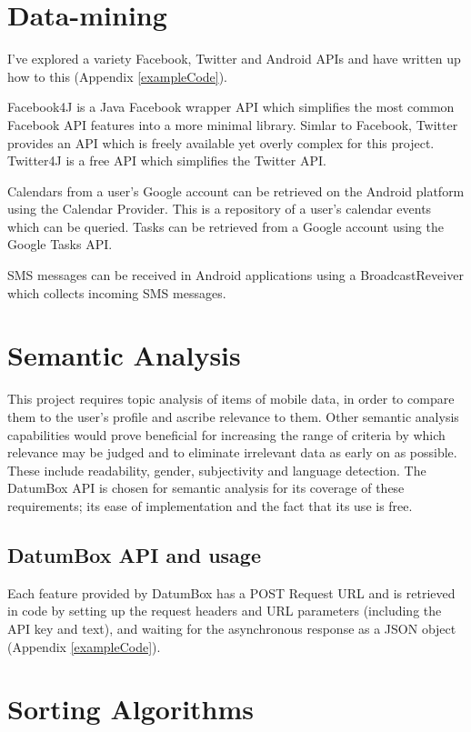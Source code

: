 \section{Data-mining}

I've explored a variety Facebook, Twitter and Android APIs and have written up how to this  (Appendix \ref{exampleCode}).

Facebook4J is a Java Facebook wrapper API which simplifies the most common Facebook API features into a more minimal library. Simlar to Facebook, Twitter provides an API which is freely available yet overly complex for this project. Twitter4J is a free API which simplifies the Twitter API.

Calendars from a user's Google account can be retrieved on the Android platform using the Calendar Provider. This is a repository of a user's calendar events which can be queried. Tasks can be retrieved from a Google account using the Google Tasks API.

SMS messages can be received in Android applications using a BroadcastReveiver which collects incoming SMS messages.

\section{Semantic Analysis}

This project requires topic analysis of items of mobile data, in order to compare them to the user's profile and ascribe relevance to them. Other semantic analysis capabilities would prove beneficial for increasing the range of criteria by which relevance may be judged and to eliminate irrelevant data as early on as possible. These include readability, gender, subjectivity and language detection. The DatumBox API is chosen for semantic analysis for its coverage of these requirements; its ease of implementation and the fact that its use is free. 

\subsection{DatumBox API and usage}

Each feature provided by DatumBox has a POST Request URL and is retrieved in code by setting up the request headers and URL parameters (including the API key and text), and waiting for the asynchronous response as a JSON object (Appendix \ref{exampleCode}).

\section{Sorting Algorithms}

